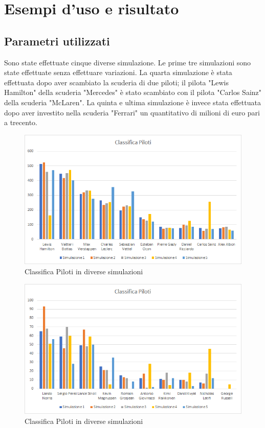 \chapter{Esempi d'uso e risultato}
\label{sec:Esempi d'uso e risultato}

\section[Parametri utilizzati]{Parametri utilizzati} %
Sono state effettuate cinque diverse simulazione. Le prime tre simulazioni sono state effettuate senza effettuare variazioni. La quarta simulazione è stata effettuata dopo aver scambiato la scuderia di due piloti; il pilota "Lewis Hamilton" della scuderia "Mercedes" è stato scambiato con il pilota "Carlos Sainz" della scuderia "McLaren". La quinta e ultima simulazione è invece stata effettuata dopo aver investito nella scuderia "Ferrari" un quantitativo di milioni di euro pari a trecento.
\begin{figure}[h]
\centering
\includegraphics[width=0.9\linewidth]{images/classifica Piloti1.png}
\caption{Classifica Piloti in diverse simulazioni}
\label{fig:Classifica Piloti in diverse simulazioni}
\end{figure}
\begin{figure}[h]
\centering
\includegraphics[width=0.9\linewidth]{images/classifica Piloti2.png}
\caption{Classifica Piloti in diverse simulazioni}
\label{fig:Classifica Piloti in diverse simulazioni}
\end{figure}
